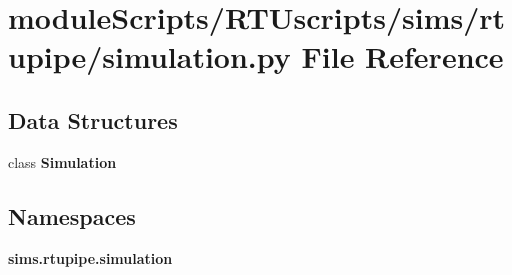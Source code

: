 \section{module\+Scripts/\+R\+T\+Uscripts/sims/rtupipe/simulation.py File Reference}
\label{rtupipe_2simulation_8py}
\subsection*{Data Structures}
\begin{DoxyCompactItemize}
\item 
class {\bf Simulation}
\end{DoxyCompactItemize}
\subsection*{Namespaces}
\begin{DoxyCompactItemize}
\item 
 {\bf sims.\+rtupipe.\+simulation}
\end{DoxyCompactItemize}
